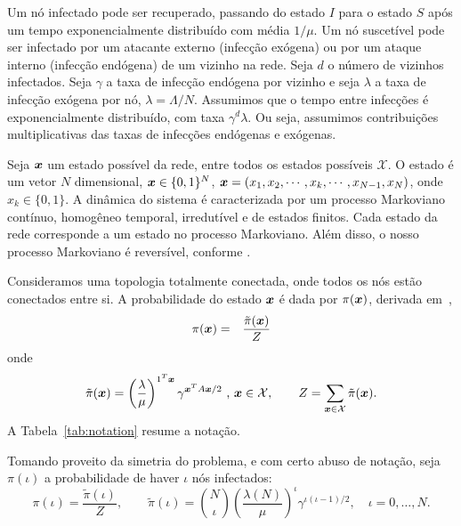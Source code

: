     	Um nó infectado pode ser recuperado, passando do estado $I$  para o estado $S$ após um tempo  exponencialmente distribuído com média 
    	$1/\mu$.
    	Um nó suscetível pode ser infectado por um atacante externo (infecção exógena) ou por um ataque interno (infecção endógena) de um vizinho na rede. Seja $d$ o número de vizinhos infectados.  
    	Seja $\gamma$ a taxa de infecção endógena por vizinho e seja $\lambda$ a taxa de infecção exógena por nó, $\lambda = \Lambda /N$.  
    	Assumimos que o tempo entre  infecções é exponencialmente distribuído, com taxa  $\gamma^d \lambda$. Ou seja, assumimos contribuições  multiplicativas das taxas de infecções endógenas e exógenas.  

    	Seja $\boldsymbol {x}$ um estado possível da rede, entre todos os estados possíveis $\mathcal{X}$. O estado é um vetor $N$ dimensional, $\boldsymbol {x} \in \{0,1\}^N$, $\boldsymbol {x}=(x_1, x_2, \cdots, x_k, \cdots, x_{N-1},x_{N})$, onde $x_k \in \{0,1\}$. A dinâmica do sistema é caracterizada por um processo Markoviano contínuo, homogêneo temporal, irredutível e de estados finitos. Cada estado da rede corresponde a um estado no processo Markoviano. Além disso, o nosso processo Markoviano é reversível, conforme \cite{kelly1979reversibility}.

    	Consideramos uma topologia totalmente conectada, onde todos os nós estão conectados entre si. A probabilidade do estado $\boldsymbol {x}$ é dada por $\pi(\boldsymbol {x})$, derivada em~\cite{zhang2017contact},
    	\begin{eqnarray}
    	    \pi(\boldsymbol {x}) & = & \frac{\tilde{\pi}(\boldsymbol {x})}{Z} \label{eq:equilibriumBasicScaledSIS}
    	\end{eqnarray}
	    onde
        \begin{equation}
            \tilde{\pi}(\boldsymbol {x})=\left( \frac{\lambda}{\mu}\right)^{1^{T}\boldsymbol {x}} \gamma^{\boldsymbol {x}^{T}A\boldsymbol {x}/2} \textrm{ , } \boldsymbol {x} \in \mathcal{X}, \qquad 	  Z= \sum_{\boldsymbol {x} \in \mathcal{X}} \tilde{\pi}(\boldsymbol {x}). \label{eq:equilibriumNumeratorScaledSIS}
        \end{equation}
        A Tabela~\ref{tab:notation} resume a notação.  

        Tomando proveito da simetria do problema, e com certo abuso de notação, seja $\pi(\iota)$ a probabilidade de haver $\iota$ nós infectados:
        \begin{equation}
            \pi(\iota) = \frac{\tilde{\pi}(\iota)}{Z}, \qquad \tilde{\pi}(\iota) = \binom{N}{\iota} \left(\frac{\lambda(N)}{\mu}\right)^{\iota} \gamma^{\iota(\iota-1)/2}, \quad \iota=0, \ldots, N.  \label{eq:scaledSISProbIotaInfected}
        \end{equation}


